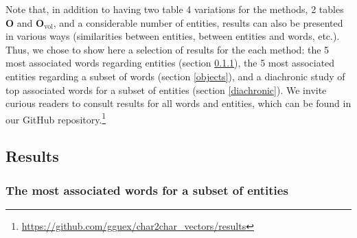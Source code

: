 \documentclass[
twocolumn,
]{ceurart}
\begin{document}
Note that, in addition to having two table 4 variations for the methods, 2 tables $\mathbf{O}$ and $\mathbf{O}_\text{vol}$, and a considerable number of entities, results can also be presented in various ways (similarities between entities, between entities and words, etc.). Thus, we chose to show here a selection of results for the each method: the 5 most associated words regarding entities (section \ref{words}), the 5 most associated entities regarding a subset of words (section \ref{objects}), and a diachronic study of top associated words for a subset of entities (section \ref{diachronic}). We invite curious readers to consult results for all words and entities, which can be found in our GitHub repository.\footnote{\url{https://github.com/gguex/char2char_vectors/results}}

\subsection{Results}

\subsubsection{The most associated words for a subset of entities}
\label{words}

\end{document}
